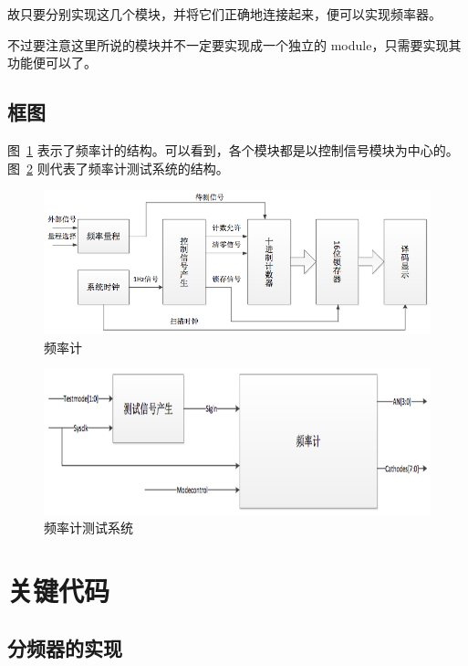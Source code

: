 \documentclass[11pt,a4paper]{article}
\begin{document}
故只要分别实现这几个模块，并将它们正确地连接起来，便可以实现频率器。

不过要注意这里所说的模块并不一定要实现成一个独立的 module，只需要实现其功能便可以了。

\subsection{框图}
图~\ref{fig:频率计} 表示了频率计的结构。可以看到，各个模块都是以控制信号模块为中心的。
图~\ref{fig:频率计测试系统} 则代表了频率计测试系统的结构。

\begin{figure}[htb]
  \centering
    \includegraphics[width=\textwidth]{exp3_freq_meter}
  \caption{频率计}
  \label{fig:频率计}
\end{figure}

\begin{figure}[htb]
  \centering
    \includegraphics[width=\textwidth]{exp3_freq_meter_tb}
  \caption{频率计测试系统}
  \label{fig:频率计测试系统}
\end{figure}

\section{关键代码}

\subsection{分频器的实现}
\end{document}
